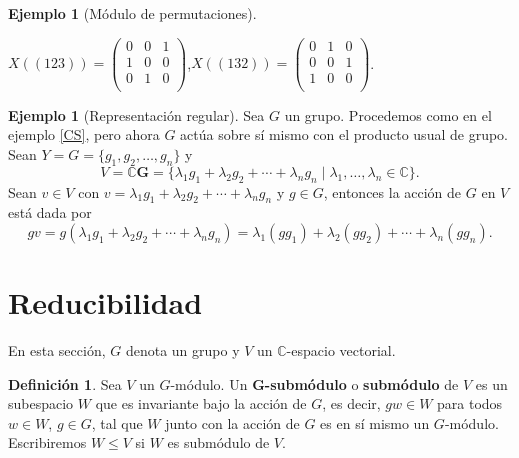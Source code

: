 \documentclass[12pt]{book}
\theoremstyle{definition}
\newtheorem{definition}[theorem]{Definición}
\newtheorem{example}[theorem]{Ejemplo}
\newcounter{in}
\newcounter{ini}
\begin{document}
\begin{example}[Módulo de permutaciones]
  \begin{center}
    $X((123))=\begin{pmatrix}
      0 & 0 & 1 \\
      1 & 0 & 0 \\
      0 & 1 & 0 \\
    \end{pmatrix}$,\quad $X((132))=\begin{pmatrix}
      0 & 1 & 0 \\
      0 & 0 & 1 \\
      1 & 0 & 0 \\
    \end{pmatrix}$.
  \end{center}
\end{example}

\begin{example}[Representación regular]
  Sea $G$ un grupo. Procedemos como en el ejemplo \ref{CS}, pero ahora $G$
  actúa sobre sí mismo con el producto usual de grupo. Sean $Y=G=\{g_{1},g_{2},\ldots,g_{n}\}$ y 
  \begin{equation*}
    V=\mathbb{C}\boldsymbol{G}=\{\lambda_{1}g_{1}+\lambda_{2}g_{2}+\cdots
    +\lambda_{n}g_{n}\mid\lambda_{1},\ldots,\lambda_{n}\in \mathbb{C}\}.
  \end{equation*}
 Sean $v\in V$ con $v=\lambda_{1}g_{1}+\lambda_{2}g_{2}+\cdots
 +\lambda_{n}g_{n}$ y $g\in G$, entonces la acción de $G$ en $V$ está dada por
  \begin{equation*}
    gv=g(\lambda_{1}g_{1}+\lambda_{2}g_{2}+\cdots +\lambda_{n}g_{n})=\lambda_{1}(gg_{1})+\lambda_{2}(gg_{2})+\cdots +\lambda_{n}(gg_{n}).
  \end{equation*}  
\end{example}

\section{Reducibilidad}
\label{reducibilidad}

En esta sección, $G$ denota un grupo y $V$ un $\mathbb{C}$-espacio vectorial.

\begin{definition}
  Sea $V$ un $G$-módulo. Un $\boldsymbol{G}$\textbf{-submódulo} o \textbf{submódulo} de $V$ es un subespacio
  $W$ que es invariante bajo la acción de $G$, es decir, $ gw\in W$
  para todos $w\in W$, $g\in G$, tal que $W$ junto con la acción de
  $G$ es en sí mismo un $G$-módulo. Escribiremos $W\leq V$ si $W$ es
  submódulo de $V$. 
\end{definition}
\end{document}
